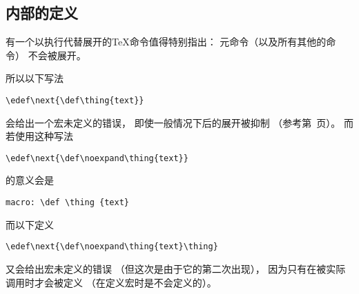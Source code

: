 \documentclass{book}
\begin{document}
\subsection{内部的定义}

有一个以执行代替展开的{\TeX}命令值得特别指出：
元命令（以及所有其他的命令）
不会被展开。

所以以下写法
\begin{verbatim}
\edef\next{\def\thing{text}}
\end{verbatim}
会给出一个宏未定义的错误，
即使一般情况下后的展开被抑制
（参考第~\pageref{noexp:list}页）。
而若使用这种写法
\begin{verbatim}
\edef\next{\def\noexpand\thing{text}}
\end{verbatim}
的意义会是
\begin{verbatim}
macro: \def \thing {text}
\end{verbatim}
而以下定义
\begin{verbatim}
\edef\next{\def\noexpand\thing{text}\thing}
\end{verbatim}
又会给出宏未定义的错误
（但这次是由于它的第二次出现），
因为只有在被实际调用时才会被定义
（在定义宏时是不会定义的）。
\end{document}
